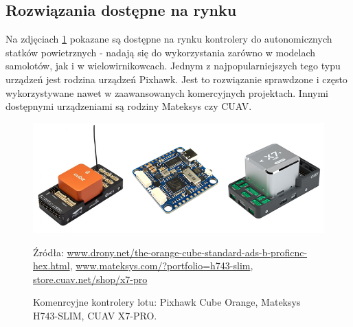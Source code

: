 \documentclass[12pt, a4paper]{article}
\begin{document}
\FloatBarrier
 
\subsection{Rozwiązania dostępne na rynku}
Na zdjęciach \ref{fig:kontrolery} pokazane są dostępne na rynku kontrolery do autonomicznych statków powietrznych - nadają się do wykorzystania zarówno w modelach samolotów, jak i w wielowirnikowcach. Jednym z najpopularniejszych tego typu urządzeń jest rodzina urządzeń Pixhawk. Jest to rozwiązanie sprawdzone i często wykorzystywane nawet w zaawansowanych komercyjnych projektach. Innymi dostępnymi urządzeniami są rodziny Mateksys czy CUAV.

 \begin{figure}[ht]
    \centering
    \includegraphics[width=1\textwidth]{kontrolery}
    \caption{Komenrcyjne kontrolery lotu: Pixhawk Cube Orange, Mateksys H743-SLIM, CUAV X7-PRO.}
    \small Źródła: \url{www.drony.net/the-orange-cube-standard-ads-b-proficnc-hex.html}, \url{www.mateksys.com/?portfolio=h743-slim}, \url{store.cuav.net/shop/x7-pro}
    \label{fig:kontrolery}
\end{figure}
\end{document}

